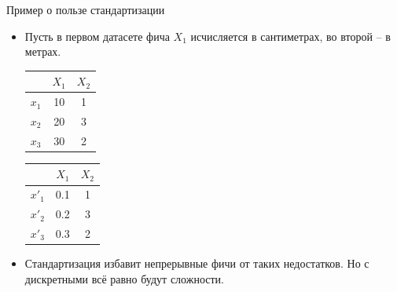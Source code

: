 \documentclass[9pt]{beamer}
\begin{document}
\begin{frame}{Пример о пользе стандартизации}
\begin{itemize}
    \item<1-> Пусть в первом датасете фича $X_1$ исчисляется в сантиметрах, во второй -- в метрах.
    \begin{center}
    \begin{tabular}{c|c|c}
        & $X_1$ & $X_2$ \\
        \hline
        $x_1$ & 10 & 1 \\
        $x_2$ & 20 & 3 \\
        $x_3$ & 30 & 2 \\
    \end{tabular}\quad\quad\quad\quad\quad\quad\quad\quad
    \begin{tabular}{c|c|c}
        & $X_1$ & $X_2$ \\
        \hline
        $x'_1$ & 0.1 & 1 \\
        $x'_2$ & 0.2 & 3 \\
        $x'_3$ & 0.3 & 2 \\
    \end{tabular}
    \end{center}

    \pause

    \item Стандартизация избавит непрерывные фичи от таких недостатков. Но с дискретными всё равно будут сложности.
\end{itemize}
\end{frame}
\end{document}

